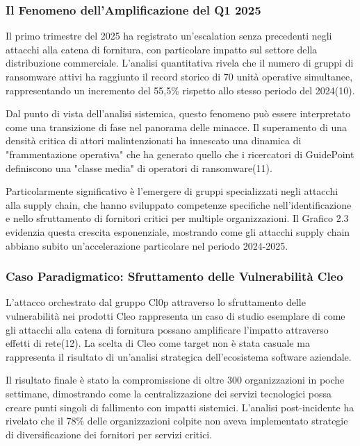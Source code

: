 \documentclass[12pt,a4paper,oneside]{book}
\begin{document}
\subsubsection{Il Fenomeno dell'Amplificazione del Q1 2025}

Il primo trimestre del 2025 ha registrato un'escalation senza precedenti negli attacchi alla catena di fornitura, con particolare impatto sul settore della distribuzione commerciale. L'analisi quantitativa rivela che il numero di gruppi di ransomware attivi ha raggiunto il record storico di 70 unità operative simultanee, rappresentando un incremento del 55,5\% rispetto allo stesso periodo del 2024(10).

Dal punto di vista dell'analisi sistemica, questo fenomeno può essere interpretato come una transizione di fase nel panorama delle minacce. Il superamento di una densità critica di attori malintenzionati ha innescato una dinamica di "frammentazione operativa" che ha generato quello che i ricercatori di GuidePoint definiscono una "classe media" di operatori di ransomware(11).

Particolarmente significativo è l'emergere di gruppi specializzati negli attacchi alla supply chain, che hanno sviluppato competenze specifiche nell'identificazione e nello sfruttamento di fornitori critici per multiple organizzazioni. Il Grafico 2.3 evidenzia questa crescita esponenziale, mostrando come gli attacchi supply chain abbiano subito un'accelerazione particolare nel periodo 2024-2025.

\subsubsection{Caso Paradigmatico: Sfruttamento delle Vulnerabilità Cleo}

L'attacco orchestrato dal gruppo Cl0p attraverso lo sfruttamento delle vulnerabilità nei prodotti Cleo rappresenta un caso di studio esemplare di come gli attacchi alla catena di fornitura possano amplificare l'impatto attraverso effetti di rete(12). La scelta di Cleo come target non è stata casuale ma rappresenta il risultato di un'analisi strategica dell'ecosistema software aziendale.

Il risultato finale è stato la compromissione di oltre 300 organizzazioni in poche settimane, dimostrando come la centralizzazione dei servizi tecnologici possa creare punti singoli di fallimento con impatti sistemici. L'analisi post-incidente ha rivelato che il 78\% delle organizzazioni colpite non aveva implementato strategie di diversificazione dei fornitori per servizi critici.
\end{document}
